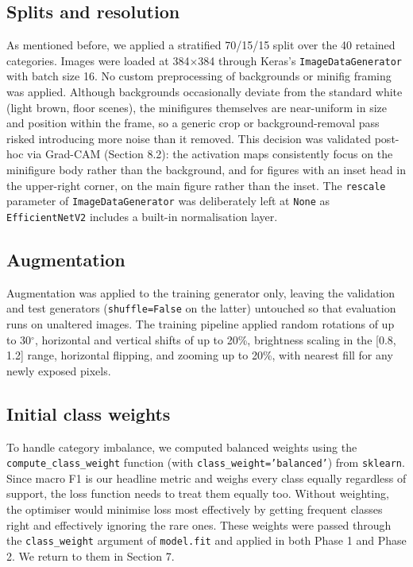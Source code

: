 \subsection{Splits and resolution}
As mentioned before, we applied a stratified 70/15/15 split over the 40 retained categories. Images were loaded at 384$\times$384 through Keras's \texttt{ImageDataGenerator} with batch size 16.
No custom preprocessing of backgrounds or minifig framing was applied. Although backgrounds occasionally deviate from the standard white (light brown, floor scenes), the minifigures themselves are near-uniform in size and position within the frame, so a generic crop or background-removal pass risked introducing more noise than it removed. This decision was validated post-hoc via Grad-CAM (Section 8.2): the activation maps consistently focus on the minifigure body rather than the background, and for figures with an inset head in the upper-right corner, on the main figure rather than the inset.
The \texttt{rescale} parameter of \texttt{ImageDataGenerator} was deliberately left at \texttt{None} as \texttt{EfficientNetV2} includes a built-in normalisation layer.

\subsection{Augmentation}
Augmentation was applied to the training generator only, leaving the validation and test generators (\texttt{shuffle=False} on the latter) untouched so that evaluation runs on unaltered images. The training pipeline applied random rotations of up to 30$^\circ$, horizontal and vertical shifts of up to 20\%, brightness scaling in the [0.8, 1.2] range, horizontal flipping, and zooming up to 20\%, with nearest fill for any newly exposed pixels.

\subsection{Initial class weights}
To handle category imbalance, we computed balanced weights using the \texttt{compute\_}\allowbreak\texttt{class\_}\allowbreak\texttt{weight} function (with \texttt{class\_}\allowbreak\texttt{weight='balanced'}) from \texttt{sklearn}. Since macro F1 is our headline metric and weighs every class equally regardless of support, the loss function needs to treat them equally too. Without weighting, the optimiser would minimise loss most effectively by getting frequent classes right and effectively ignoring the rare ones. These weights were passed through the \texttt{class\_weight} argument of \texttt{model.fit} and applied in both Phase 1 and Phase 2. We return to them in Section 7.

